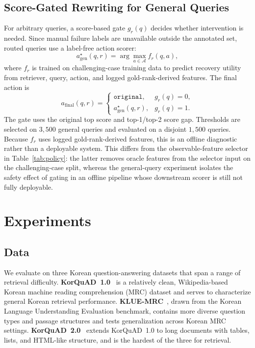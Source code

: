 \documentclass{article}
\begin{document}
\subsection{Score-Gated Rewriting for General Queries}
\label{sec:gate}

For arbitrary queries, a score-based gate $g_r(q)$ decides whether intervention
is needed. Since manual failure labels are unavailable outside the annotated
set, routed queries use a label-free action scorer:
\begin{equation}
a_{\mathrm{gen}}^\star(q,r)
=
\arg\max_{a \in \mathcal{A}} f_r(q,a),
\end{equation}
where $f_r$ is trained on challenging-case training data to predict recovery
utility from retriever, query, action, and logged gold-rank-derived features.
The final action is
\begin{equation}
a_{\text{final}}(q, r) =
\begin{cases}
\texttt{original}, & g_r(q)=0, \\
a_{\mathrm{gen}}^\star(q,r), & g_r(q)=1.
\end{cases}
\label{eq:gate}
\end{equation}
The gate uses the original top score and top-1/top-2 score gap. Thresholds are
selected on $3{,}500$ general queries and evaluated on a disjoint $1{,}500$
queries. Because $f_r$ uses logged gold-rank-derived features, this is an
offline diagnostic rather than a deployable system. This differs from the
observable-feature selector in Table~\ref{tab:policy}: the latter removes oracle
features from the selector input on the challenging-case split, whereas the
general-query experiment isolates the safety effect of gating in an offline
pipeline whose downstream scorer is still not fully deployable.

\section{Experiments}

\subsection{Data}
\label{sec:data}

We evaluate on three Korean question-answering datasets that span a range of
retrieval difficulty. \textbf{KorQuAD~1.0}~\cite{lim2019korquad} is a relatively
clean, Wikipedia-based Korean machine reading comprehension (MRC) dataset and
serves to characterize general Korean retrieval performance.
\textbf{KLUE-MRC}~\cite{park2021klue}, drawn from the Korean Language
Understanding Evaluation benchmark, contains more diverse question types and
passage structures and tests generalization across Korean MRC settings.
\textbf{KorQuAD~2.0}~\cite{kim2019korquad2} extends KorQuAD~1.0 to long documents
with tables, lists, and HTML-like structure, and is the hardest of the three for
retrieval.
\end{document}
